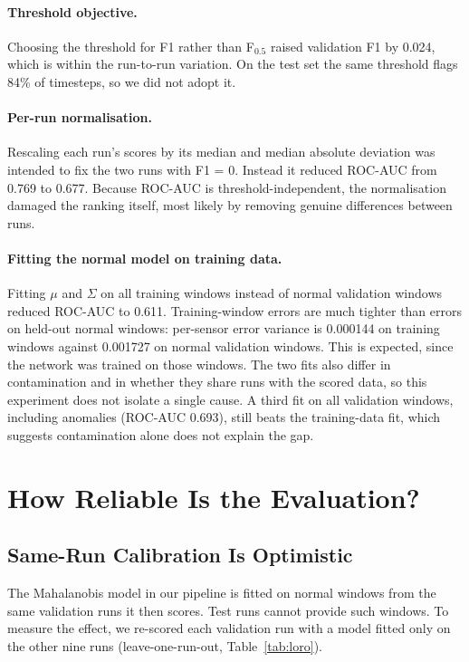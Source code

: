 \documentclass[runningheads]{llncs}
\begin{document}
\paragraph{Threshold objective.} Choosing the threshold for F1 rather than F$_{0.5}$ raised validation F1 by 0.024, which is within the run-to-run variation. On the test set the same threshold flags 84\% of timesteps, so we did not adopt it.

\paragraph{Per-run normalisation.} Rescaling each run's scores by its median and median absolute deviation was intended to fix the two runs with F1 = 0. Instead it reduced ROC-AUC from 0.769 to 0.677. Because ROC-AUC is threshold-independent, the normalisation damaged the ranking itself, most likely by removing genuine differences between runs.

\paragraph{Fitting the normal model on training data.} Fitting $\mu$ and $\Sigma$ on all training windows instead of normal validation windows reduced ROC-AUC to 0.611. Training-window errors are much tighter than errors on held-out normal windows: per-sensor error variance is 0.000144 on training windows against 0.001727 on normal validation windows. This is expected, since the network was trained on those windows. The two fits also differ in contamination and in whether they share runs with the scored data, so this experiment does not isolate a single cause. A third fit on all validation windows, including anomalies (ROC-AUC 0.693), still beats the training-data fit, which suggests contamination alone does not explain the gap.

\section{How Reliable Is the Evaluation?}\label{sec:protocol}

\subsection{Same-Run Calibration Is Optimistic}

The Mahalanobis model in our pipeline is fitted on normal windows from the same validation runs it then scores. Test runs cannot provide such windows. To measure the effect, we re-scored each validation run with a model fitted only on the other nine runs (leave-one-run-out, Table~\ref{tab:loro}).
\end{document}
